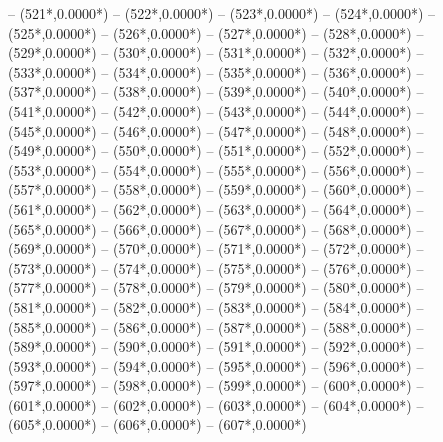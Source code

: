 {		-- ({521*\dx},{0.0000*\dy})
		-- ({522*\dx},{0.0000*\dy})
		-- ({523*\dx},{0.0000*\dy})
		-- ({524*\dx},{0.0000*\dy})
		-- ({525*\dx},{0.0000*\dy})
		-- ({526*\dx},{0.0000*\dy})
		-- ({527*\dx},{0.0000*\dy})
		-- ({528*\dx},{0.0000*\dy})
		-- ({529*\dx},{0.0000*\dy})
		-- ({530*\dx},{0.0000*\dy})
		-- ({531*\dx},{0.0000*\dy})
		-- ({532*\dx},{0.0000*\dy})
		-- ({533*\dx},{0.0000*\dy})
		-- ({534*\dx},{0.0000*\dy})
		-- ({535*\dx},{0.0000*\dy})
		-- ({536*\dx},{0.0000*\dy})
		-- ({537*\dx},{0.0000*\dy})
		-- ({538*\dx},{0.0000*\dy})
		-- ({539*\dx},{0.0000*\dy})
		-- ({540*\dx},{0.0000*\dy})
		-- ({541*\dx},{0.0000*\dy})
		-- ({542*\dx},{0.0000*\dy})
		-- ({543*\dx},{0.0000*\dy})
		-- ({544*\dx},{0.0000*\dy})
		-- ({545*\dx},{0.0000*\dy})
		-- ({546*\dx},{0.0000*\dy})
		-- ({547*\dx},{0.0000*\dy})
		-- ({548*\dx},{0.0000*\dy})
		-- ({549*\dx},{0.0000*\dy})
		-- ({550*\dx},{0.0000*\dy})
		-- ({551*\dx},{0.0000*\dy})
		-- ({552*\dx},{0.0000*\dy})
		-- ({553*\dx},{0.0000*\dy})
		-- ({554*\dx},{0.0000*\dy})
		-- ({555*\dx},{0.0000*\dy})
		-- ({556*\dx},{0.0000*\dy})
		-- ({557*\dx},{0.0000*\dy})
		-- ({558*\dx},{0.0000*\dy})
		-- ({559*\dx},{0.0000*\dy})
		-- ({560*\dx},{0.0000*\dy})
		-- ({561*\dx},{0.0000*\dy})
		-- ({562*\dx},{0.0000*\dy})
		-- ({563*\dx},{0.0000*\dy})
		-- ({564*\dx},{0.0000*\dy})
		-- ({565*\dx},{0.0000*\dy})
		-- ({566*\dx},{0.0000*\dy})
		-- ({567*\dx},{0.0000*\dy})
		-- ({568*\dx},{0.0000*\dy})
		-- ({569*\dx},{0.0000*\dy})
		-- ({570*\dx},{0.0000*\dy})
		-- ({571*\dx},{0.0000*\dy})
		-- ({572*\dx},{0.0000*\dy})
		-- ({573*\dx},{0.0000*\dy})
		-- ({574*\dx},{0.0000*\dy})
		-- ({575*\dx},{0.0000*\dy})
		-- ({576*\dx},{0.0000*\dy})
		-- ({577*\dx},{0.0000*\dy})
		-- ({578*\dx},{0.0000*\dy})
		-- ({579*\dx},{0.0000*\dy})
		-- ({580*\dx},{0.0000*\dy})
		-- ({581*\dx},{0.0000*\dy})
		-- ({582*\dx},{0.0000*\dy})
		-- ({583*\dx},{0.0000*\dy})
		-- ({584*\dx},{0.0000*\dy})
		-- ({585*\dx},{0.0000*\dy})
		-- ({586*\dx},{0.0000*\dy})
		-- ({587*\dx},{0.0000*\dy})
		-- ({588*\dx},{0.0000*\dy})
		-- ({589*\dx},{0.0000*\dy})
		-- ({590*\dx},{0.0000*\dy})
		-- ({591*\dx},{0.0000*\dy})
		-- ({592*\dx},{0.0000*\dy})
		-- ({593*\dx},{0.0000*\dy})
		-- ({594*\dx},{0.0000*\dy})
		-- ({595*\dx},{0.0000*\dy})
		-- ({596*\dx},{0.0000*\dy})
		-- ({597*\dx},{0.0000*\dy})
		-- ({598*\dx},{0.0000*\dy})
		-- ({599*\dx},{0.0000*\dy})
		-- ({600*\dx},{0.0000*\dy})
		-- ({601*\dx},{0.0000*\dy})
		-- ({602*\dx},{0.0000*\dy})
		-- ({603*\dx},{0.0000*\dy})
		-- ({604*\dx},{0.0000*\dy})
		-- ({605*\dx},{0.0000*\dy})
		-- ({606*\dx},{0.0000*\dy})
		-- ({607*\dx},{0.0000*\dy})
}

